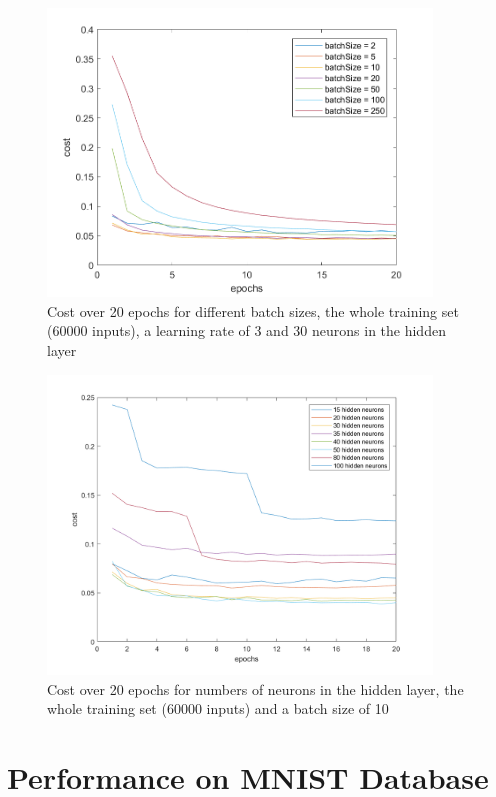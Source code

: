 \newpage
\begin{figure}[h!]
\centering
    \centering
    \includegraphics[width=0.91\textwidth]{test_src/img/20epochs/costOverEpochs_batchSize}
    \caption{Cost over 20 epochs for different batch sizes, the whole training set (60000 inputs), a learning rate of 3 and 30 neurons in the hidden layer}
    \label{fig:costTestset_batchSize}
\end{figure}
\begin{figure}[h!]
\centering
    \centering
    \includegraphics[width=0.91\textwidth]{test_src/img/20epochs/costOverEpochs_numNeurons}
    \caption{Cost over 20 epochs for numbers of neurons in the hidden layer, the whole training set (60000 inputs) and a batch size of 10}
    \label{fig:costTestset_numNeurons}
\end{figure}


\section{Performance on MNIST Database}\label{detRate}
